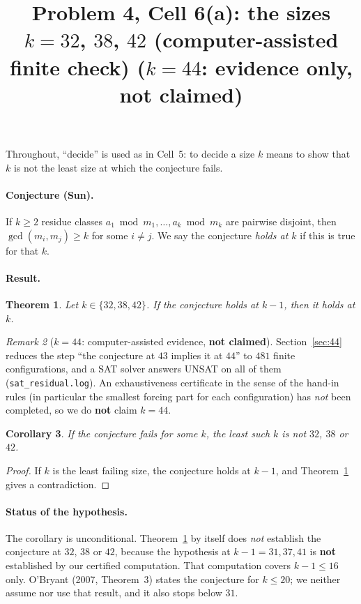 \documentclass[11pt]{article}
\title{Problem 4, Cell 6(a): the sizes $k=32$, $38$, $42$ (computer-assisted finite check) ($k=44$: evidence only, not claimed)}
\author{}
\date{}
\newtheorem{theorem}{Theorem}
\newtheorem{corollary}[theorem]{Corollary}
\theoremstyle{definition}
\theoremstyle{remark}
\newtheorem{remark}[theorem]{Remark}
\begin{document}
\maketitle

\noindent{}
\medskip

\noindent Throughout, ``decide'' is used as in Cell~5: to decide a size $k$ means to show that $k$ is not
the least size at which the conjecture fails.

\paragraph{Conjecture (Sun).} If $k\ge2$ residue classes $a_1\bmod m_1,\dots,a_k\bmod m_k$ are
pairwise disjoint, then $\gcd(m_i,m_j)\ge k$ for some $i\ne j$. We say the conjecture
\emph{holds at $k$} if this is true for that $k$.

\paragraph{Result.}
\begin{theorem}\label{thm:main}
Let $k\in\{32,38,42\}$. If the conjecture holds at $k-1$, then it holds at $k$.
\end{theorem}

\begin{remark}[$k=44$: computer-assisted evidence, \textbf{not claimed}]\label{thm:44}
Section~\ref{sec:44} reduces the step ``the conjecture at $43$ implies it at $44$'' to $481$ finite
configurations, and a SAT solver answers UNSAT on all of them (\texttt{sat\_residual.log}). An
exhaustiveness certificate in the sense of the hand-in rules (in particular the smallest forcing
part for each configuration) has \emph{not} been completed, so we do \textbf{not} claim $k=44$.
\end{remark}

\begin{corollary}\label{cor:main}
If the conjecture fails for some $k$, the least such $k$ is not $32$, $38$ or $42$.
\end{corollary}
\begin{proof}
If $k$ is the least failing size, the conjecture holds at $k-1$, and Theorem~\ref{thm:main} gives a
contradiction.
\end{proof}

\paragraph{Status of the hypothesis.} The corollary is unconditional. Theorem~\ref{thm:main} by
itself does \emph{not} establish the conjecture at $32$, $38$ or $42$, because the hypothesis
at $k-1=31,37,41$ is \textbf{not} established by our certified computation. That computation
covers $k-1\le16$ only. O'Bryant (2007, Theorem~3) states the conjecture for $k\le20$; we neither
assume nor use that result, and it also stops below $31$.
\end{document}
